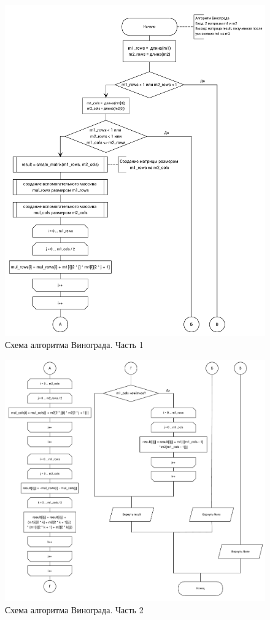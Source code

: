 \begin{figure}[H]
\centering
\includegraphics[width=\textwidth]{inc/img/winograd_1.pdf}
\caption{Схема алгоритма Винограда. Часть 1}
\label{fig:winograd_scheme_1}
\end{figure}

\begin{figure}[H]
\centering
\includegraphics[width=\textwidth]{inc/img/winograd_2.pdf}
\caption{Схема алгоритма Винограда. Часть 2}
\label{fig:winograd_scheme_2}
\end{figure}

